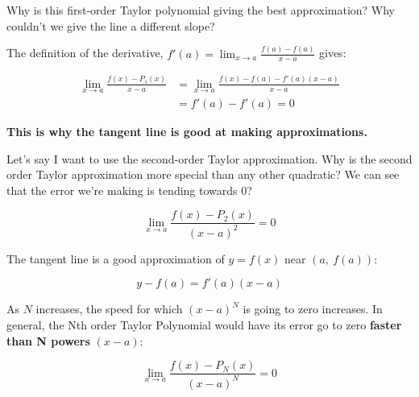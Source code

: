 \documentclass[12pt]{article}
\theoremstyle{plain}
\theoremstyle{remark}
\theoremstyle{definition}
\begin{document}
Why is this first-order Taylor polynomial giving the best approximation?
Why couldn't we give the line a different slope?

The definition of the derivative,
\(f'(a) = \lim_{x \rightarrow a}\frac{f(a) - f(a)}{x - a}\) gives:

\begin{align*}
\lim_{x \rightarrow a}\frac{f(x) - P_{1}(x)}{x - a} &= \lim_{x \rightarrow a}\frac{f(x) - f(a) - f'(a)(x - a)}{x - a} \\
&= f'(a) - f'(a) = 0
\end{align*}


\textbf{This is why the tangent line is good at making approximations.}

Let's say I want to use the second-order Taylor approximation. Why is
the second order Taylor approximation more special than any other
quadratic? We can see that the error we're making is tending towards 0?

\[\lim_{x \rightarrow a}\frac{f(x) - P_{2}(x)}{(x - a)^{2}} = 0\]

The tangent line is a good approximation of \(y = f(x)\) near
\(\left( a,\ f(a) \right)\):

\[y - f(a) = f'(a)(x - a)\]

As \(N\) increases, the speed for which \((x - a)^{N}\) is going to zero
increases. In general, the Nth order Taylor Polynomial would have its
error go to zero \textbf{faster than N powers} \((x - a):\)

\[\lim_{x \rightarrow a}\frac{f(x) - P_{N}(x)}{(x - a)^{N}} = 0\]
\end{document}
